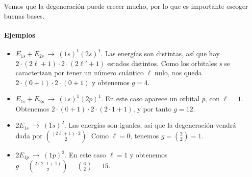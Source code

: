Vemos que la degeneración puede crecer mucho, por lo que es importante
escoger buenas bases. 

\paragraph{Ejemplos}
\begin{itemize}
\item $E_{1s}+E_{2s} \ \rightarrow \ (1s)^1(2s)^1$. Las energías son
  distintas, así que hay $2\cdot(2\ell+1)\cdot 2 \cdot (2\ell'+1)$
  estados distintos. Como los orbitales \emph{s} se caracterizan por
  tener un número cuántico $\ell$ nulo, nos queda $2\cdot(0+1)\cdot 2
  \cdot (0+1)$ y obtenemos $g=4$.
\item $E_{1s}+E_{2p} \ \rightarrow \ (1s)^1(2p)^1$. En este caso
  aparece un orbital \emph{p}, con $\ell = 1$. Obtenemos $2\cdot(0+1)\cdot 2
  \cdot (2\cdot 1+1)$, y por tanto $g = 12$.
\item $2E_{1s} \ \rightarrow \ (1s)^2$. Las energías son iguales, así
  que la degeneración vendrá dada por $\binom{(2\ell +1)\cdot 2}{2}$.
  Como $\ell =0$, tenemos $g=\binom{2}{2}=1$.
\item $2E_{1p} \ \rightarrow \ (1p)^2$. En este caso $\ell =1$ y obtenemos 
  $g=\binom{2(2\cdot1 +1)}{2}=\binom{6}{2}=15$.
\end{itemize}

